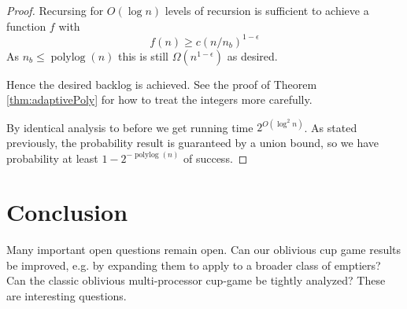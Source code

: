 \documentclass[twocolumn]{article}[10pt]
\DeclareMathOperator{\polylog}{\text{polylog}}
\begin{document}
\begin{proof}
  Recursing for $O(\log n)$ levels of recursion is sufficient to achieve a function $f$ with 
  $$f(n) \ge c(n/n_b)^{1-\epsilon}$$
  As $n_b \le \polylog(n)$ this is still $\Omega(n^{1-\epsilon})$ as desired.

  Hence the desired backlog is achieved. See the proof of Theorem
  \ref{thm:adaptivePoly} for how to treat the integers more carefully.

  By identical analysis to before we get running time $2^{O(\log^2 n)}$.
  As stated previously, the probability result is guaranteed by a union bound,
  so we have probability at least $1-2^{-\polylog(n)}$ of success.
\end{proof}


\section{Conclusion}
Many important open questions remain open. Can our oblivious cup game results
be improved, e.g. by expanding them to apply to a broader class of emptiers?
Can the classic oblivious multi-processor cup-game be tightly analyzed?
These are interesting questions.



\end{document}

